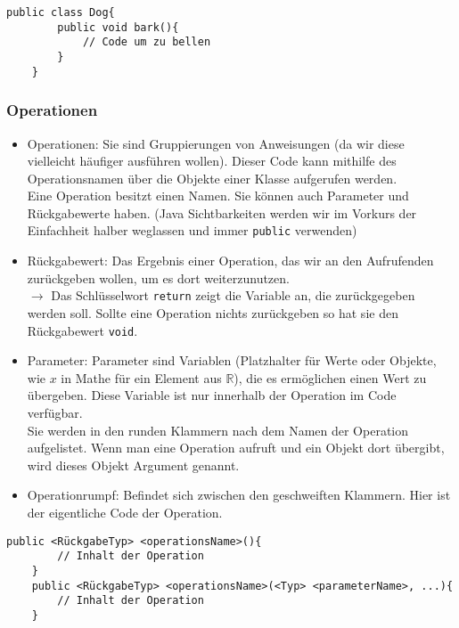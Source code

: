 \begin{lstlisting}[title=\textbf{Beispiel: Klasse}]
	public class Dog{
		public void bark(){
			// Code um zu bellen
		}
	}
\end{lstlisting}
\begin{Infobox}
	\subsubsection*{Operationen}
	\begin{itemize}
		\item Operationen: Sie sind Gruppierungen von Anweisungen (da wir diese vielleicht häufiger ausführen wollen).
		Dieser Code kann mithilfe des Operationsnamen über die Objekte einer Klasse aufgerufen werden.\\
		Eine Operation besitzt einen Namen. Sie können auch Parameter und Rückgabewerte haben. (Java Sichtbarkeiten werden wir im Vorkurs der Einfachheit halber weglassen und immer \lstinline{public} verwenden)
		\item Rückgabewert: Das Ergebnis einer Operation, das wir an den Aufrufenden zurückgeben wollen, um es dort weiterzunutzen.\\
		$\rightarrow$ Das Schlüsselwort \lstinline{return} zeigt die Variable an, die zurückgegeben werden soll.
		Sollte eine Operation nichts zurückgeben so hat sie den Rückgabewert \lstinline{void}.
		\item Parameter: Parameter sind Variablen (Platzhalter für Werte oder Objekte, wie $x$ in Mathe für ein Element aus $\mathbb{R}$), die es ermöglichen einen Wert zu übergeben. Diese Variable ist nur innerhalb der Operation im Code verfügbar.\\
			Sie werden in den runden Klammern nach dem Namen der Operation aufgelistet.
			Wenn man eine Operation aufruft und ein Objekt dort übergibt, wird dieses Objekt Argument genannt.
		\item Operationrumpf: Befindet sich zwischen den geschweiften Klammern. Hier ist der eigentliche Code der Operation.
	\end{itemize}

\end{Infobox}

\begin{lstlisting}[title=\textbf{Operationen Syntax}]
	public <RückgabeTyp> <operationsName>(){
		// Inhalt der Operation
	}
	public <RückgabeTyp> <operationsName>(<Typ> <parameterName>, ...){
		// Inhalt der Operation
	}
\end{lstlisting}

